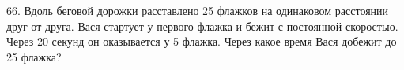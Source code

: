 66. Вдоль беговой дорожки расставлено 25 флажков на одинаковом расстоянии друг от друга. Вася стартует у первого флажка и бежит с постоянной скоростью. Через 20 секунд он оказывается у 5 флажка. Через какое время Вася добежит до 25 флажка?\\
